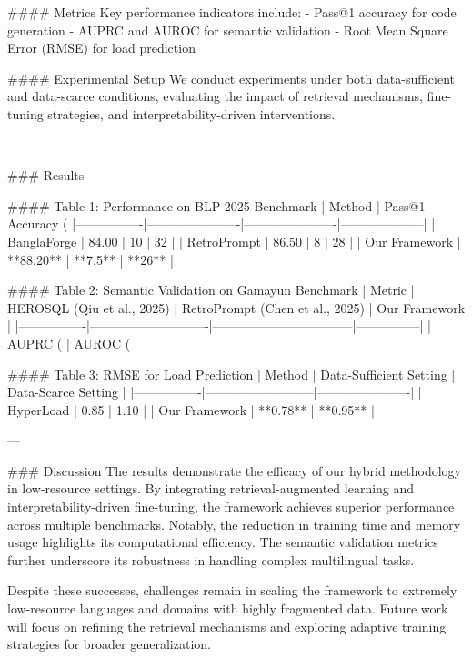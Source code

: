 #### Metrics
Key performance indicators include:
- Pass@1 accuracy for code generation
- AUPRC and AUROC for semantic validation
- Root Mean Square Error (RMSE) for load prediction

#### Experimental Setup
We conduct experiments under both data-sufficient and data-scarce conditions, evaluating the impact of retrieval mechanisms, fine-tuning strategies, and interpretability-driven interventions.

---

### Results

#### Table 1: Performance on BLP-2025 Benchmark
| Method         | Pass@1 Accuracy (%
|----------------|----------------------|----------------------|--------------------|
| BanglaForge    | 84.00               | 10                   | 32                 |
| RetroPrompt    | 86.50               | 8                    | 28                 |
| Our Framework  | **88.20**           | **7.5**              | **26**             |

#### Table 2: Semantic Validation on Gamayun Benchmark
| Metric         | HEROSQL (Qiu et al., 2025) | RetroPrompt (Chen et al., 2025) | Our Framework |
|----------------|----------------------------|---------------------------------|---------------|
| AUPRC (%
| AUROC (%

#### Table 3: RMSE for Load Prediction
| Method         | Data-Sufficient Setting | Data-Scarce Setting |
|----------------|--------------------------|----------------------|
| HyperLoad      | 0.85                    | 1.10                 |
| Our Framework  | **0.78**                | **0.95**             |

---

### Discussion
The results demonstrate the efficacy of our hybrid methodology in low-resource settings. By integrating retrieval-augmented learning and interpretability-driven fine-tuning, the framework achieves superior performance across multiple benchmarks. Notably, the reduction in training time and memory usage highlights its computational efficiency. The semantic validation metrics further underscore its robustness in handling complex multilingual tasks.

Despite these successes, challenges remain in scaling the framework to extremely low-resource languages and domains with highly fragmented data. Future work will focus on refining the retrieval mechanisms and exploring adaptive training strategies for broader generalization.

